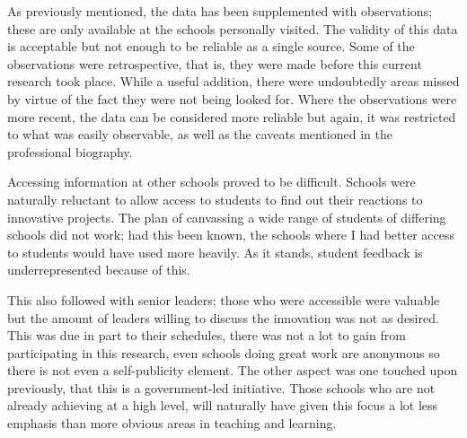 As previously mentioned, the data has been supplemented with observations; these are only available at the schools personally visited. The validity of this data is acceptable but not enough to be reliable as a single source. Some of the observations were retrospective, that is, they were made before this current research took place. While a useful addition, there were undoubtedly areas missed by virtue of the fact they were not being looked for. Where the observations were more recent, the data can be considered more reliable but again, it was restricted to what was easily observable, as well as the caveats mentioned in the professional biography.

Accessing information at other schools proved to be difficult. Schools were naturally reluctant to allow access to students to find out their reactions to innovative projects. The plan of canvassing a wide range of students of differing schools did not work; had this been known, the schools where I had better access to students would have used more heavily. As it stands, student feedback is underrepresented because of this. 

This also followed with senior leaders; those who were accessible were valuable but the amount of leaders willing to discuss the innovation was not as desired. This was due in part to their schedules, there was not a lot to gain from participating in this research, even schools doing great work are anonymous so there is not even a self-publicity element. The other aspect was one touched upon previously, that this is a government-led initiative. Those schools who are not already achieving at a high level, will naturally have given this focus a lot less emphasis than more obvious areas in teaching and learning. 



